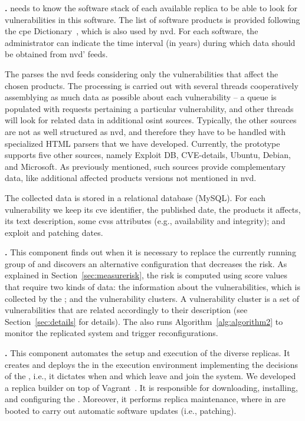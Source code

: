  \textbf{\fetcher.} \system needs to know the software stack of each available replica to be able to look for vulnerabilities in this software.
The list of software products is provided following the \gls{cpe} Dictionary~\cite{cpe}, which is also used by \gls{nvd}. 
For each software, the administrator can indicate the time interval (in years) during which data should be obtained from \gls{nvd}' feeds.

The \fetcher parses the \gls{nvd} feeds considering only the vulnerabilities that affect the chosen products. 
The processing is carried out with several threads cooperatively assemblying as much data as possible about each vulnerability -- a queue is populated with requests pertaining a particular vulnerability, and other threads will look for related data in additional \gls{osint} sources. 
Typically, the other sources are not as well structured as \gls{nvd}, and therefore they have to be handled with specialized HTML parsers that we have developed. 
Currently, the prototype supports five other sources, namely Exploit DB, CVE-details, Ubuntu, Debian, and Microsoft. 
As previously mentioned, such sources provide complementary data, like additional affected products versions not mentioned in \gls{nvd}.

The collected data is stored in a relational database (MySQL).
For each vulnerability we keep its \gls{cve} identifier, the published date, the products it affects, its text description, some \gls{cvss} attributes (e.g., availability and integrity); and exploit and patching dates.


 \textbf{\risk.} This component finds out when it is necessary to replace the currently running group of \replicas and discovers an alternative configuration that decreases the risk. 
As explained in Section~\ref{sec:measurerisk}, the risk is computed using score values that require two kinds of data: the information about the vulnerabilities, which is collected by the \fetcher; and the vulnerability clusters. 
A vulnerability cluster is a set of vulnerabilities that are related accordingly to their description (see Section~\ref{sec:details} for details).
The \risk also runs Algorithm~\ref{alg:algorithm2} to monitor the replicated system and trigger reconfigurations.


 \textbf{\manager.} 
This component automates the setup and execution of the diverse replicas. 
It creates and deploys the \replicas in the execution environment implementing the decisions of the \risk, i.e., it dictates when and which \replicas leave and join the system. 
We developed a replica builder on top of Vagrant~\cite{vagrant}.
It is responsible for downloading, installing, and configuring the \replicas.
Moreover, it performs replica maintenance, where  \replicas in \QS are booted to carry out automatic software updates (i.e., patching). 


